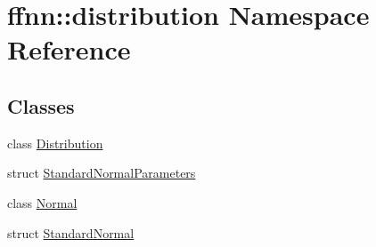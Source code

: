 \hypertarget{namespaceffnn_1_1distribution}{\section{ffnn\-:\-:distribution Namespace Reference}
\label{namespaceffnn_1_1distribution}
}
\subsection*{Classes}
\begin{DoxyCompactItemize}
\item 
class \hyperlink{classffnn_1_1distribution_1_1_distribution}{Distribution}
\item 
struct \hyperlink{structffnn_1_1distribution_1_1_standard_normal_parameters}{Standard\-Normal\-Parameters}
\item 
class \hyperlink{classffnn_1_1distribution_1_1_normal}{Normal}
\item 
struct \hyperlink{structffnn_1_1distribution_1_1_standard_normal}{Standard\-Normal}
\end{DoxyCompactItemize}
